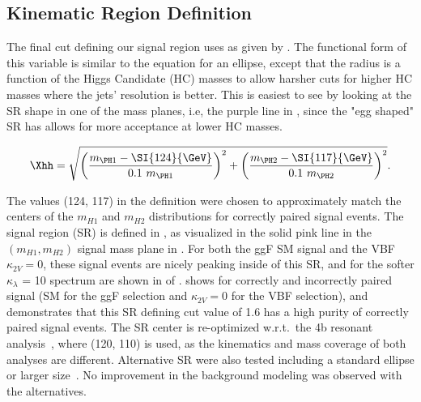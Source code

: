 \subsection{Kinematic Region Definition}
\label{sec:selection:region}

The final cut defining our signal region uses \Xhh as given by \Eqn{\ref{eq:xhh}}. The functional form of this variable is similar to the equation for an ellipse, except that the radius is a function of the Higgs Candidate (HC) masses to allow harsher cuts for higher HC masses where the jets' resolution is better. This is easiest to see by looking at the SR shape in one of the mass planes, i.e, the purple line in \Fig{\ref{fig:ggF-massplanes-allYrs-SM}}, since the "egg shaped" SR has allows for more acceptance at lower HC masses.

\begin{equation}
    \Xhh =  \sqrt{\left(\frac{m_{\PH1} - \SI{124}{\GeV}}{0.1 \ m_{\PH1}}\right)^{2} + \left(\frac{m_{\PH2} - \SI{117}{\GeV}}{0.1 \ m_{\PH2}}\right)^{2}} .
    \label{eq:xhh}
\end{equation}

The values (124, 117) in the \Xhh definition were chosen to approximately match the centers of the $m_{H1}$ and $m_{H2}$ distributions for correctly paired signal events. 
The signal region (SR) is defined in \Eqn{\ref{eq:sr}}, as visualized in the solid pink line in the $(m_{H1}, m_{H2})$ signal mass plane in \Fig{\ref{fig:massplanes-allYrs-signal}}. For both the ggF SM signal and the VBF $\kappa_{2V} = 0$, these signal events are nicely peaking inside of this SR, and for the softer $\kappa_\lambda$ = 10 spectrum are shown in \Fig{\ref{fig:massplanes-allYrs-kl-10}} of \App{\ref{app:evt-sel}}.
\Fig{\ref{fig:ggF-Xhh}} shows \Xhh for correctly and incorrectly paired signal (SM for the ggF selection and $\kappa_{2V} = 0$ for the VBF selection), and demonstrates that this SR defining cut value of 1.6 has a high purity of correctly paired signal events.
The SR center is re-optimized w.r.t.\ the 4b resonant analysis~\cite{bbbbresolvedNote}, where (120, 110) is used, as the kinematics and mass coverage of both analyses are different.
Alternative SR were also tested including a standard ellipse or larger size~\cite{slides:SR-opt}.
No improvement in the background modeling was observed with the alternatives.

